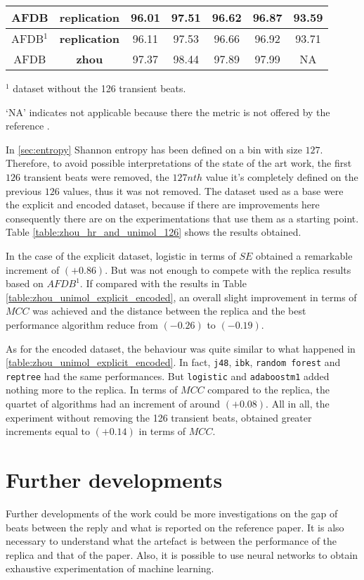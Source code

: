 \begin{table}[h]
\begin{center}
\begin{threeparttable}
\begin{tabular}{c c c c c c c}
  \hline
  AFDB & \textbf{replication} & 96.01 & 97.51 & 96.62 & 96.87 & 93.59 \\
  \hline
  AFDB$^1$ & \textbf{replication} & 96.11 & 97.53 & 96.66 & 96.92 & 93.71 \\
  \hline
  AFDB & \textbf{zhou} & 97.37 & 98.44 & 97.89 & 97.99 & NA \\
  \bottomrule
\end{tabular}
\begin{tablenotes}
	\item $^1$ dataset without the 126 transient beats.
 	\item ‘NA’ indicates not applicable because there the metric is not offered by the reference \cite{zhou2015}.
    \end{tablenotes}
\end{threeparttable}
\end{center}
\end{table}
In \ref{sec:entropy} Shannon entropy has been defined on a bin with size $127$. Therefore, to avoid possible interpretations of the state of the art work, the first $126$ transient beats were removed, the $127nth$ value it's completely defined on the previous $126$ values, thus it was not removed. The dataset used as a base were the explicit and encoded dataset, because if there are improvements here consequently there are on the experimentations that use them as a starting point. Table \ref{table:zhou_hr_and_unimol_126} shows the results obtained.

In the case of the explicit dataset, logistic in terms of $SE$ obtained a remarkable increment of $(+0.86)$. But was not enough to compete with the replica results based on $AFDB^1$. If compared with the results in Table \ref{table:zhou_unimol_explicit_encoded}, an overall slight improvement in terms of $MCC$ was achieved and the distance between the replica and the best performance algorithm reduce from $(-0.26)$ to  $(-0.19)$.

As for the encoded dataset, the behaviour was quite similar to what happened in \ref{table:zhou_unimol_explicit_encoded}. In fact, \verb|j48|, \verb|ibk|, \verb|random forest| and \verb|reptree| had the same performances. But \verb|logistic| and \verb|adaboostm1| added nothing more to the replica. In terms of $MCC$ compared to the replica, the quartet of algorithms had an increment of around $(+0.08)$. All in all, the experiment without removing the 126 transient beats, obtained greater increments equal to $(+0.14)$ in terms of $MCC$.

\section{Further developments}
Further developments of the work could be more investigations on the gap of beats between the reply and what is reported on the reference paper. It is also necessary to understand what the artefact is between the performance of the replica and that of the paper.
Also, it is possible to use neural networks to obtain exhaustive experimentation of machine learning.
